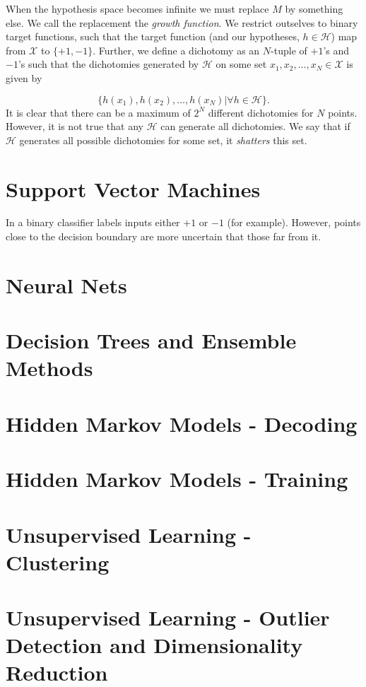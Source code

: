 \documentclass[oneside]{memoir}
\begin{document}
When the hypothesis space becomes infinite we must replace $M$ by something else. We call the replacement the \emph{growth function}. We restrict outselves to binary target functions, such that the target function (and our hypotheses, $h \in \mathcal{H}$) map from $\mathcal{X}$ to $\{+1,-1\}$. Further, we define a dichotomy as an $N$-tuple of $+1$'s and $-1$'s such that the dichotomies generated by $\mathcal{H}$ on some set $x_1,x_2,\dots,x_N \in \mathcal{X}$ is given by

\begin{equation}
  \label{dichotomies}
  \{h(x_1),h(x_2),\dots,h(x_N) | \forall h \in \mathcal{H}\}. 
\end{equation}
It is clear that there can be a maximum of $2^N$ different dichotomies for $N$ points. However, it is not true that any $\mathcal{H}$ can generate all dichotomies. We say that if $\mathcal{H}$ generates all possible dichotomies for some set, it \emph{shatters} this set. 


\section{Support Vector Machines}

In a binary classifier labels inputs either $+1$ or $-1$ (for example). However, points close to the decision boundary are more uncertain that those far from it.  


\section{Neural Nets}
\section{Decision Trees and Ensemble Methods}
\section{Hidden Markov Models - Decoding}
\section{Hidden Markov Models - Training}
\section{Unsupervised Learning - Clustering}
\section{Unsupervised Learning - Outlier Detection and Dimensionality Reduction}
\end{document}
